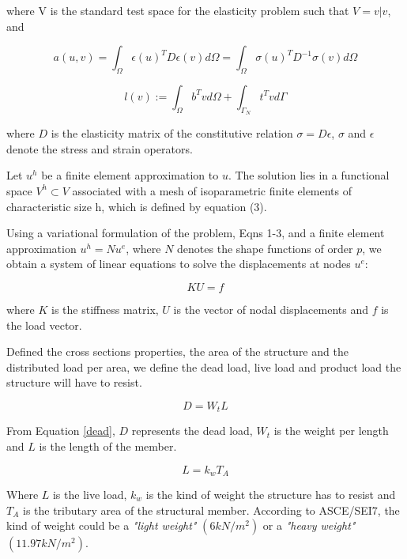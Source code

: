 \documentclass[twocolumn,10pt]{asme2e}
\begin{document}
where V is the standard test space for the elasticity problem such that $V = {v | v }$, and 

\begin{equation}
	a (u,v) = \int _\Omega \epsilon (u ) ^T D \epsilon (v) d \Omega = \int _\Omega \sigma (u)^T D ^{-1} \sigma (v) d\Omega
\end{equation}

\begin{equation}
l (v) := \int _\Omega b^T v d\Omega + \int _{\Gamma _N} t^T v d \Gamma
\end{equation}

where $D$ is the elasticity matrix of the constitutive relation $\sigma = D \epsilon$, $\sigma$ and $\epsilon$ denote the stress and strain operators.

Let $u ^h$ be a finite element approximation to $u$. The solution lies in a functional space $V ^h \subset V$ associated with a mesh of isoparametric finite elements of characteristic size h, which is defined by equation (3). 

Using a variational formulation of the problem, Eqns 1-3, and a finite element approximation $u^h = N u^{e}$, where $N$ denotes the shape functions of order $p$, we obtain a system of linear equations to solve the displacements at nodes $u^e$:

\begin{equation}
K U = f
\end{equation}

where $K$ is the stiffness matrix, $U$ is the vector of nodal displacements and $f$ is the load vector.

Defined the cross sections properties, the area of the structure and the distributed load per area, we define the dead load, live load and product load the structure will have to resist. 

\begin{equation}
	D = W_t L 
	\label{dead}
\end{equation}

From Equation \ref{dead}, $D$ represents the dead load, $W_t$ is the weight per length and $L$ is the length of the member.

\begin{equation}
L = k_w T_A
\label{live}
\end{equation}

Where $L$ is the live load, $k_w$ is the kind of weight the structure has to resist and $T_A$ is the tributary area of the structural member. According to ASCE/SEI7, the kind of weight could be a \textit{"light weight"} $\left(6 kN / m^2 \right)$ or a \textit{"heavy weight"} $\left(11.97 kN / m^2 \right)$.
\end{document}
